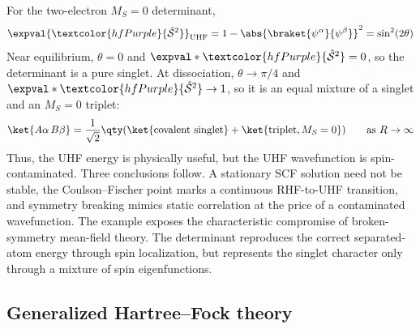 \documentclass[11pt,a4paper,titlepage]{article}
\numberwithin{equation}{section}
\newcommand{\chS}{\Hat{\mathcal{S}}}
\newcommand{\purple}[1]{\textcolor{hfPurple}{#1}}
\begin{document}
For the two-electron $M_S=0$ determinant,
\begin{equation}
    \expval{\purple{\chS^2}}_\text{UHF}
    =1-\abs{\braket{\psi^\alpha}{\psi^\beta}}^2
    =\sin^2(2\theta)
\end{equation}
Near equilibrium, $\theta=0$ and $\expval*{\purple{\chS^2}}=0$, so the
determinant is a pure singlet. At dissociation, $\theta\rightarrow\pi/4$ and
$\expval*{\purple{\chS^2}}\rightarrow1$, so it is an equal mixture of a
singlet and an $M_S=0$ triplet:
\begin{equation}
  \ket{A\alpha\,B\beta}
  =\frac{1}{\sqrt2}\qty(
    \ket{\text{covalent singlet}}
    +\ket{\text{triplet},M_S=0})
  \qquad\text{as }R\to\infty
\end{equation}
Thus, the UHF energy is physically useful, but the UHF wavefunction is
spin-contaminated. Three conclusions follow. A stationary SCF solution need
not be stable, the Coulson--Fischer point marks a continuous RHF-to-UHF
transition, and symmetry breaking mimics static correlation at the price of a
contaminated wavefunction.
The example exposes the characteristic compromise of broken-symmetry
mean-field theory. The determinant reproduces the correct separated-atom
energy through spin localization, but represents the singlet character only
through a mixture of spin eigenfunctions.

\subsection{Generalized Hartree--Fock theory}
\end{document}
